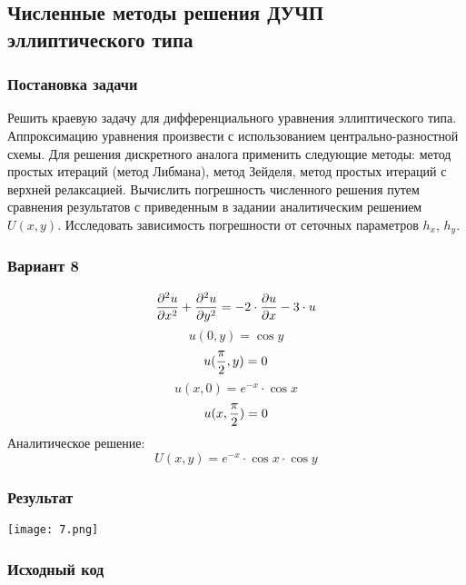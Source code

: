 \graphicspath{{images/}}

\subsection{Численные методы решения ДУЧП эллиптического типа}

\subsubsection{Постановка задачи}
Решить краевую задачу для дифференциального уравнения эллиптического типа. Аппроксимацию уравнения произвести с использованием центрально-разностной схемы. Для решения дискретного аналога применить следующие методы: метод простых итераций (метод Либмана), метод Зейделя, метод простых итераций с верхней релаксацией. Вычислить погрешность численного решения путем сравнения результатов с приведенным в задании аналитическим решением $U(x,y)$.  Исследовать зависимость погрешности от сеточных параметров $h_x$, $h_y$.

\subsubsection{Вариант 8}
$$ {{\partial^2 u} \over {\partial x^2}} + {{\partial^2 u} \over {\partial y^2}} = -2\cdot{{\partial u} \over {\partial x}} -3 \cdot u $$
$$ u(0, y) = \cos{y} $$
$$ u({{\pi} \over {2}}, y) = 0 $$
$$ u(x, 0) = e ^ {-x} \cdot \cos{x} $$
$$ u(x, {{\pi} \over {2}}) = 0 $$
Аналитическое решение:
$$ U(x, y) = e ^ {-x} \cdot \cos{x} \cdot \cos{y} $$
\pagebreak

\subsubsection{Результат}
\begin{center}
    \texttt{[image: 7.png]}\newline\noindent
\end{center}
\pagebreak

\subsubsection{Исходный код}

\pagebreak
